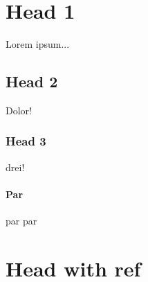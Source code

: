 \section{Head 1}
Lorem ipsum...

\subsection{Head 2}
Dolor!

\subsubsection{Head 3}
drei!

\paragraph{Par}
par par

\section{Head with ref \label{refname}}
